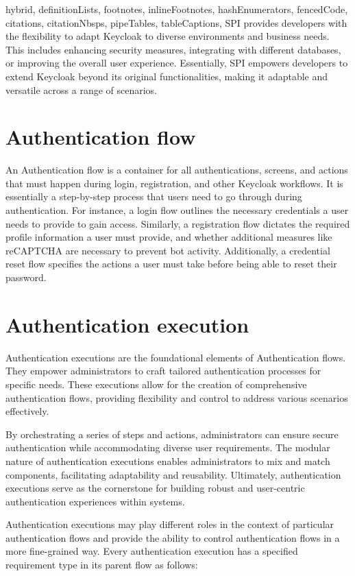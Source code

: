 \documentclass[
  digital,     %
  oneside,     %
  nosansbold,  %
  nocolorbold, %
  lof,         %
  lot,         %
]{fithesis4}
\begin{document}
\begin{markdown*}{%
  hybrid,
  definitionLists,
  footnotes,
  inlineFootnotes,
  hashEnumerators,
  fencedCode,
  citations,
  citationNbsps,
  pipeTables,
  tableCaptions,
}
SPI provides developers with the flexibility to adapt Keycloak to diverse environments and business needs.
This includes enhancing security measures, integrating with different databases, or improving the overall user experience. Essentially, SPI empowers developers to extend Keycloak beyond its original functionalities, making it adaptable and versatile across a range of scenarios.

\section{Authentication flow}
An Authentication flow is a container for all authentications, screens, and actions that must happen during login, registration, and other Keycloak workflows.
It is essentially a step-by-step process that users need to go through during authentication.
For instance, a login flow outlines the necessary credentials a user needs to provide to gain access.
Similarly, a registration flow dictates the required profile information a user must provide, and whether additional measures like reCAPTCHA are necessary to prevent bot activity.
Additionally, a credential reset flow specifies the actions a user must take before being able to reset their password. \cite{keycloak-auth-flows}

\newpage
\section{Authentication execution}
Authentication executions are the foundational elements of Authentication flows.
They empower administrators to craft tailored authentication processes for specific needs.
These executions allow for the creation of comprehensive authentication flows, providing flexibility and control to address various scenarios effectively.

By orchestrating a series of steps and actions, administrators can ensure secure authentication while accommodating diverse user requirements.
The modular nature of authentication executions enables administrators to mix and match components, facilitating adaptability and reusability.
Ultimately, authentication executions serve as the cornerstone for building robust and user-centric authentication experiences within systems.

Authentication executions may play different roles in the context of particular authentication flows and provide the ability to control authentication flows in a more fine-grained way. \cite{keycloak-auth-flows}
Every authentication execution has a specified requirement type in its parent flow as follows:


\end{markdown*}
\end{document}

